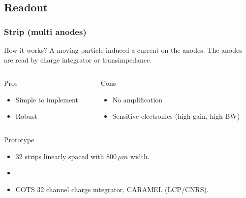 \subsection{Readout}
\begin{frame}
  \frametitle{Strip (multi anodes)}
  \begin{block}{How it works?}
    A moving particle induced a current on the anodes. The anodes are read by charge integrator or transimpedance.
  \end{block}
  \begin{columns}[T]
    \begin{column}{0.45\textwidth}
      \begin{block}{Pros}
        \begin{itemize}
          \item Simple to implement
          \item Robust
        \end{itemize}
      \end{block}
    \end{column}
    \begin{column}{0.45\textwidth}
      \begin{block}{Cons}
        \begin{itemize}
          \item No amplification
          \item Sensitive electronics (high gain, high BW)
        \end{itemize}
      \end{block}
    \end{column}
  \end{columns}
  \begin{block}{Prototype}
    \begin{itemize}
      \item 32 strips linearly spaced with $800\,\mu m$ width.
      \item    
      \item COTS 32 channel charge integrator, CARAMEL (LCP/CNRS).
    \end{itemize}
  \end{block}
\end{frame}

